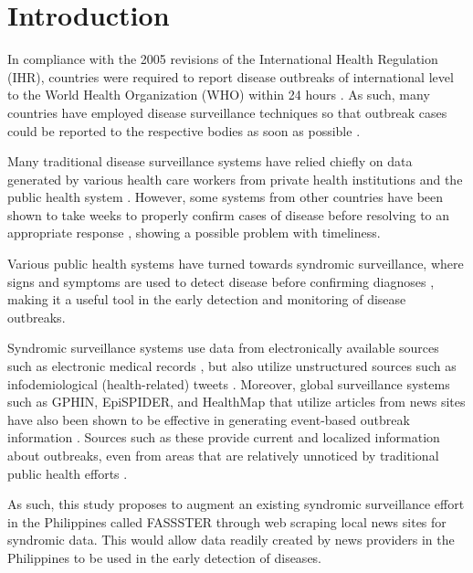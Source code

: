 \chapter{Introduction}

In compliance with the 2005 revisions of the International Health Regulation (IHR), countries were required to report disease outbreaks of international level to the World Health Organization (WHO) within 24 hours \cite{worldtechnical}. As such, many countries have employed disease surveillance techniques so that outbreak cases could be reported to the respective bodies as soon as possible \cite{hartley2010landscape}.

Many traditional disease surveillance systems have relied chiefly on data generated by various health care workers from private health institutions and the public health system \cite{rohart2016disease}. However, some systems from other countries have been shown to take weeks to properly confirm cases of disease before resolving to an appropriate response \cite{rohart2016disease}, showing a possible problem with timeliness.

Various public health systems have turned towards syndromic surveillance, where signs and symptoms are used to detect disease before confirming diagnoses \cite{mandl2004implementing}, making it a useful tool in the early detection and monitoring of disease outbreaks.

Syndromic surveillance systems use data from electronically available sources such as electronic medical records \cite{lazarus2001using}, but also utilize unstructured sources such as infodemiological (health-related) tweets \cite{espina2016towards}. Moreover, global surveillance systems such as GPHIN, EpiSPIDER, and HealthMap that utilize articles from news sites have also been shown to be effective in generating event-based outbreak information \cite{keller2009use}. Sources such as these provide current and localized information about outbreaks, even from areas that are relatively unnoticed by traditional public health efforts \cite{woodall1997official}.

As such, this study proposes to augment an existing syndromic surveillance effort in the Philippines called FASSSTER through web scraping local news sites for syndromic data. This would allow data readily created by news providers in the Philippines to be used in the early detection of diseases. 




